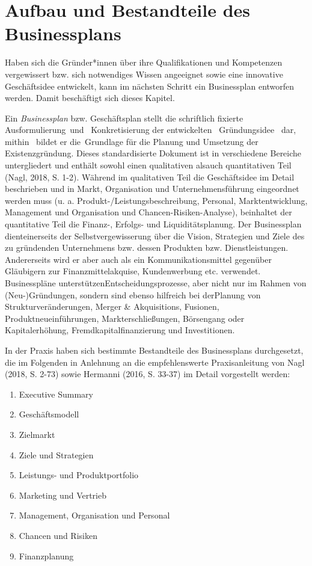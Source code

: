 \documentclass[
  letterpaper,
]{book}
\begin{document}
\section{Aufbau und Bestandteile des
Businessplans}\label{aufbau-bestandteile-businessplan}

Haben sich die Gründer*innen über ihre Qualifikationen und Kompetenzen
vergewissert bzw. sich notwendiges Wissen angeeignet sowie eine
innovative Geschäftsidee entwickelt, kann im nächsten Schritt ein
Businessplan entworfen werden. Damit beschäftigt sich dieses Kapitel.

Ein \emph{Businessplan }bzw. Geschäftsplan stellt die schriftlich
fixierte Ausformulierung~und~ Konkretisierung der entwickelten~
Gründungsidee~ dar, mithin~ bildet er die~Grundlage für die Planung und
Umsetzung der Existenzgründung. Dieses standardisierte Dokument ist in
verschiedene Bereiche untergliedert und enthält sowohl einen
qualitativen alsauch quantitativen Teil (Nagl, 2018, S. 1-2). Während im
qualitativen Teil die Geschäftsidee im Detail beschrieben und in Markt,
Organisation und Unternehmensführung eingeordnet werden muss (u. a.
Produkt-/Leistungsbeschreibung, Personal, Marktentwicklung, Management
und Organisation und Chancen-Risiken-Analyse), beinhaltet der
quantitative Teil die Finanz-, Erfolgs- und Liquiditätsplanung. Der
Businessplan dienteinerseits der Selbstvergewisserung über die Vision,
Strategien und Ziele des zu gründenden Unternehmens bzw. dessen
Produkten bzw. Dienstleistungen. Andererseits wird er aber auch als ein
Kommunikationsmittel gegenüber Gläubigern zur Finanzmittelakquise,
Kundenwerbung etc. verwendet. Businesspläne
unterstützenEntscheidungsprozesse, aber nicht nur im Rahmen von
(Neu-)Gründungen, sondern sind ebenso hilfreich bei derPlanung von
Strukturveränderungen, Merger \& Akquisitions, Fusionen,
Produktneueinführungen, Markterschließungen, Börsengang oder
Kapitalerhöhung, Fremdkapitalfinanzierung und Investitionen.

In der Praxis haben sich bestimmte Bestandteile des Businessplans
durchgesetzt, die im Folgenden in Anlehnung an die empfehlenswerte
Praxisanleitung von Nagl (2018, S. 2-73) sowie Hermanni (2016, S. 33-37)
im Detail vorgestellt werden:

\begin{enumerate}
\def\labelenumi{\arabic{enumi}.}
\item
  Executive Summary
\item
  Geschäftsmodell
\item
  Zielmarkt
\item
  Ziele und Strategien
\item
  Leistungs- und Produktportfolio
\item
  Marketing und Vertrieb
\item
  Management, Organisation und Personal
\item
  Chancen und Risiken
\item
  Finanzplanung
\end{enumerate}
\end{document}
